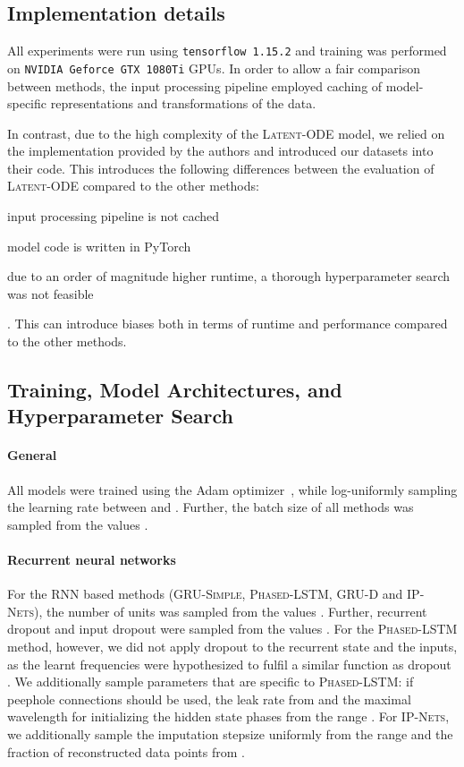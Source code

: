\documentclass{article}
\newcommand{\method}[1]{\textsc{#1}}
\begin{document}
\subsection{Implementation details}\label{appx:imp-details}

All experiments were run using \texttt{tensorflow 1.15.2} and training was
performed on \texttt{NVIDIA Geforce GTX 1080Ti} GPUs. In order to allow a fair
comparison between methods, the input processing pipeline employed
caching of model-specific representations and transformations of the data.

In contrast, due to the high complexity of the \method{Latent-ODE} model, we relied on the implementation provided by the authors and introduced our datasets into their code. This introduces the following differences between the evaluation of \method{Latent-ODE} compared to the other methods: \begin{inparaenum}
\item input processing pipeline is not cached
\item model code is written in PyTorch
\item due to an order of magnitude higher runtime, a thorough hyperparameter search was not feasible
\end{inparaenum}. This can introduce biases both in terms of runtime and
performance compared to the other methods.

\subsection{Training, Model Architectures, and Hyperparameter Search}
\label{appx:hyperparameter-search}

\paragraph{General}
All models were trained using the Adam optimizer~\citep{kingma2014adam},
while log-uniformly sampling the learning rate between  and
. Further, the batch size of all methods was sampled from the
values .

\paragraph{Recurrent neural networks}
For the RNN based methods (\method{GRU-Simple}, \method{Phased-LSTM},
\method{GRU-D} and \method{IP-Nets}), the number of units was sampled
from the values . Further, recurrent dropout
and input dropout were sampled from the values .
For the \method{Phased-LSTM} method, however, we did not apply dropout to the
recurrent state and the inputs, as the learnt frequencies were hypothesized to
fulfil a similar function as dropout \citep{neil2016phased}.  We
additionally sample parameters that are specific to \method{Phased-LSTM}: if
peephole connections should be used, the leak rate from 
and the maximal wavelength for initializing the hidden state phases from the
range . For \method{IP-Nets}, we additionally sample the
imputation stepsize uniformly from the range  and the
fraction of reconstructed data points from .
\end{document}
